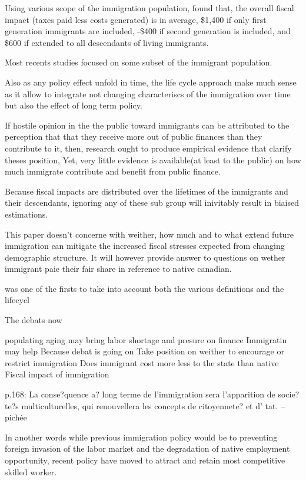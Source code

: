   Using various scope of the immigration population, \citep{Lee:1998fs}  found that, the overall fiscal impact (taxes paid less costs generated) is in average, \$1,400 if only first generation immigrants are included, -\$400 if second generation is included, and  \$600 if extended to all descendants of living immigrants.

  Most recents studies focused on some subset of the immigrant population.

  Also as any policy effect unfold in time, the life cycle approach make much sense as it allow to integrate not changing characteriscs of the immigration over time but also the effect of long term policy.





  If hostile opinion in the the public toward immigrants can be attributed to the perception that  that they receive more out of public finances than they contribute to it, then, research ought to produce empirical evidence that clarify theses position, Yet, very little evidence is available(at least to the public) on how much immigrate contribute and benefit from public finance.

  Because fiscal impacts are distributed over the lifetimes of the immigrants and their descendants, ignoring any of these sub group will inivitably result in biaised estimations.


  This paper doesn't concerne with weither, how much and to what extend future immigration can mitigate the increased fiscal stresses expected from changing demographic structure. It will however provide answer to questions on wether immigrant paie their fair share in reference to native canadian.




  \citep{Lee:1998fs} was one of the firsts  to take into account both the various definitions and the lifecycl


  The debats now

populating aging may bring labor shortage and presure on finance
Immigratin may help
Because debat is going on
Take position on weither to encourage or restrict immigration
Does immigrant cost more less to the state than native
Fiscal impact of immigration


p.168: La conse?quence a? long terme de l’immigration sera l’apparition de socie?te?s multiculturelles, qui renouvellera les concepts de citoyennete? et d’ tat. -- pichée


In another words while previous immigration policy would be to preventing foreign invasion of the labor market and the degradation of native employment opportunity, recent policy have moved to attract and retain most competitive skilled worker.




